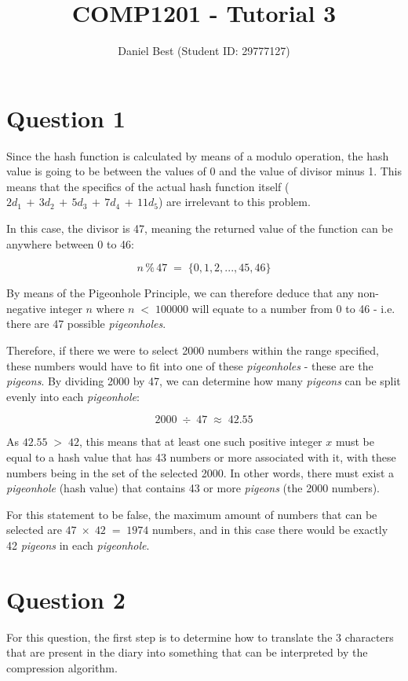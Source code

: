 \documentclass{article}
\title{COMP1201 - Tutorial 3}
\author{Daniel Best (Student ID: 29777127)}
\begin{document}
	\maketitle
	
	\newpage
	
	\section*{Question 1}
	Since the hash function is calculated by means of a modulo operation, the hash value is going to be between the values of 0 and the value of divisor minus 1. This means that the specifics of the actual hash function itself (\(2d_{1}\,+\,3d_{2}\,+\,5d_{3}\,+\,7d_{4}\,+\,11d_{5}\)) are irrelevant to this problem.
	
	In this case, the divisor is 47, meaning the returned value of the function can be anywhere between 0 to 46:
	
	\[n\,\%\,47\;=\;\{0,1,2,...,45,46\}\]
	
	By means of the Pigeonhole Principle, we can therefore deduce that any non-negative integer $n$ where \(n\;<\;100000\) will equate to a number from 0 to 46 - i.e. there are 47 possible \textit{pigeonholes}.
	
	Therefore, if there we were to select 2000 numbers within the range specified, these numbers would have to fit into one of these \textit{pigeonholes} - these are the \textit{pigeons}. By dividing 2000 by 47, we can determine how many \textit{pigeons} can be split evenly into each \textit{pigeonhole}:
	
	\[2000\;\div\;47\;\approx\;42.55\]
	
	As \(42.55\;>\;42\), this means that at least one such positive integer $x$ must be equal to a hash value that has 43 numbers or more associated with it, with these numbers being in the set of the selected 2000. In other words, there must exist a \textit{pigeonhole} (hash value) that contains 43 or more \textit{pigeons} (the 2000 numbers).
	
	For this statement to be false, the maximum amount of numbers that can be selected are \(47\;\times\;42\;=\;1974\) numbers, and in this case there would be exactly 42 \textit{pigeons} in each \textit{pigeonhole}.
	
	\section*{Question 2}
	For this question, the first step is to determine how to translate the 3 characters that are present in the diary into something that can be interpreted by the compression algorithm. 
	
\end{document}

